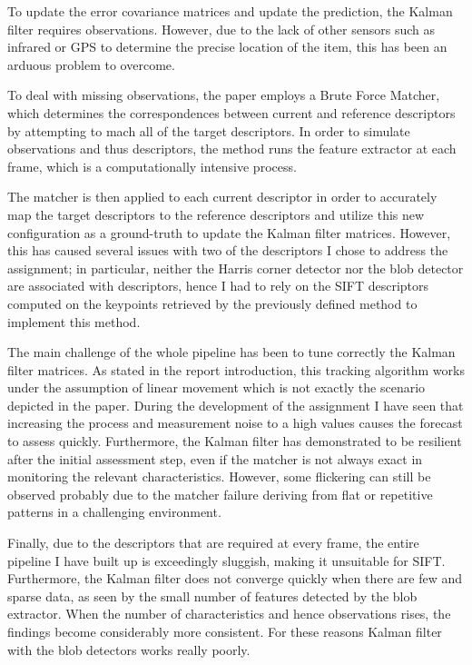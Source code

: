 \documentclass[journal]{IEEEtran}
\begin{document}
To update the error covariance matrices and update the prediction, the Kalman filter requires observations.
However, due to the lack of other sensors such as infrared or GPS to determine the precise location of the item, this has been an arduous problem to overcome.

To deal with missing observations, the paper employs a Brute Force Matcher, which determines the correspondences between current and reference descriptors by attempting to mach all of the target descriptors. In order to simulate observations and thus descriptors, the method runs the feature extractor at each frame, which is a computationally intensive process. 

The matcher is then applied to each current descriptor in order to accurately map the target descriptors to the reference descriptors and utilize this new configuration as a ground-truth to update the Kalman filter matrices.
However, this has caused several issues with two of the descriptors I chose to address the assignment; in particular, neither the Harris corner detector nor the blob detector are associated with descriptors, hence I had to rely on the SIFT descriptors computed on the keypoints retrieved by the previously defined method to implement this method. 

The main challenge of the whole pipeline has been to tune correctly the Kalman filter matrices. As stated in the report introduction, this tracking algorithm works under the assumption of linear movement which is not exactly the scenario depicted in the paper. During the development of the assignment I have seen that increasing the process and measurement noise to a high values causes the forecast to assess quickly.
Furthermore, the Kalman filter has demonstrated to be resilient after the initial assessment step, even if the matcher is not always exact in monitoring the relevant characteristics. However, some flickering can still be observed probably due to the matcher failure deriving from flat or repetitive patterns in a challenging environment.

Finally, due to the descriptors that are required at every frame, the entire pipeline I have built up is exceedingly sluggish, making it unsuitable for SIFT. Furthermore, the Kalman filter does not converge quickly when there are few and sparse data, as seen by the small number of features detected by the blob extractor. When the number of characteristics and hence observations rises, the findings become considerably more consistent. For these reasons Kalman filter with the blob detectors works really poorly.
\end{document}

